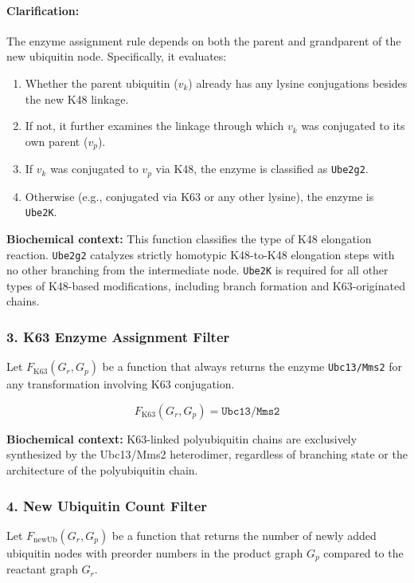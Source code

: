 \documentclass[12pt]{article}
\begin{document}
\paragraph{Clarification:} The enzyme assignment rule depends on both the parent and grandparent of the new ubiquitin node. Specifically, it evaluates:
\begin{enumerate}
    \item Whether the parent ubiquitin ($v_k$) already has any lysine conjugations besides the new K48 linkage.
    \item If not, it further examines the linkage through which $v_k$ was conjugated to its own parent ($v_p$).
    \item If $v_k$ was conjugated to $v_p$ via K48, the enzyme is classified as \texttt{Ube2g2}.
    \item Otherwise (e.g., conjugated via K63 or any other lysine), the enzyme is \texttt{Ube2K}.
\end{enumerate}

\textbf{Biochemical context:} This function classifies the type of K48 elongation reaction. \texttt{Ube2g2} catalyzes strictly homotypic K48-to-K48 elongation steps with no other branching from the intermediate node. \texttt{Ube2K} is required for all other types of K48-based modifications, including branch formation and K63-originated chains.


\subsubsection*{3. K63 Enzyme Assignment Filter}

Let $F_{\text{K63}}(G_r, G_p)$ be a function that always returns the enzyme \texttt{Ubc13/Mms2} for any transformation involving K63 conjugation.

\[
F_{\text{K63}}(G_r, G_p) = \texttt{Ubc13/Mms2}
\]

\textbf{Biochemical context:} K63-linked polyubiquitin chains are exclusively synthesized by the Ubc13/Mms2 heterodimer, regardless of branching state or the architecture of the polyubiquitin chain.



\subsubsection*{4. New Ubiquitin Count Filter}

Let $F_{\text{newUb}}(G_r, G_p)$ be a function that returns the number of newly added ubiquitin nodes with preorder numbers in the product graph $G_p$ compared to the reactant graph $G_r$.
\end{document}
